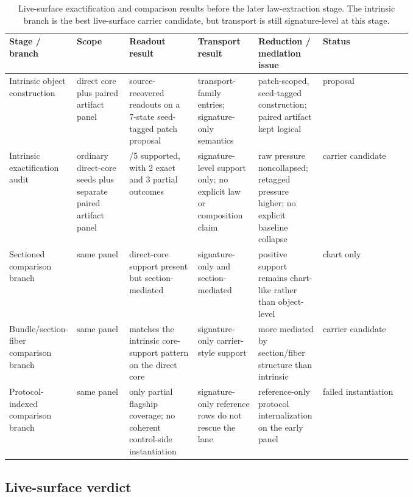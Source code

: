 \documentclass[11pt]{article}
\theoremstyle{definition}
\begin{document}
\begin{table}[t]
\centering
\footnotesize
\caption{Live-surface exactification and comparison results before the later
law-extraction stage. The intrinsic branch is the best live-surface carrier candidate,
but transport is still signature-level at this stage.}
\label{tab:live-surface-summary}
\begin{tabularx}{\linewidth}{@{}>{\raggedright\arraybackslash}p{0.16\linewidth}>{\raggedright\arraybackslash}p{0.13\linewidth}>{\raggedright\arraybackslash}p{0.17\linewidth}>{\raggedright\arraybackslash}p{0.15\linewidth}>{\raggedright\arraybackslash}p{0.16\linewidth}>{\raggedright\arraybackslash}X@{}}
\toprule
Stage / branch & Scope & Readout result & Transport result & Reduction / mediation issue & Status \\
\midrule
Intrinsic object construction & direct core plus paired artifact panel & 8 source-recovered readouts on a 7-state seed-tagged patch proposal & 3 transport-family entries; signature-only semantics & patch-scoped, seed-tagged construction; paired artifact kept logical & proposal \\
Intrinsic exactification audit & 5 ordinary direct-core seeds plus separate paired artifact panel & 5/5 supported, with 2 exact and 3 partial outcomes & signature-level support only; no explicit law or composition claim & raw pressure noncollapsed; retagged pressure higher; no explicit baseline collapse & carrier candidate \\
Sectioned comparison branch & same panel & direct-core support present but section-mediated & signature-only and section-mediated & positive support remains chart-like rather than object-level & chart only \\
Bundle/section-fiber comparison branch & same panel & matches the intrinsic core-support pattern on the direct core & signature-only carrier-style support & more mediated by section/fiber structure than intrinsic & carrier candidate \\
Protocol-indexed comparison branch & same panel & only partial flagship coverage; no coherent control-side instantiation & signature-only reference rows do not rescue the lane & reference-only protocol internalization on the early panel & failed instantiation \\
\bottomrule
\end{tabularx}
\end{table}

\subsection{Live-surface verdict}
\end{document}
